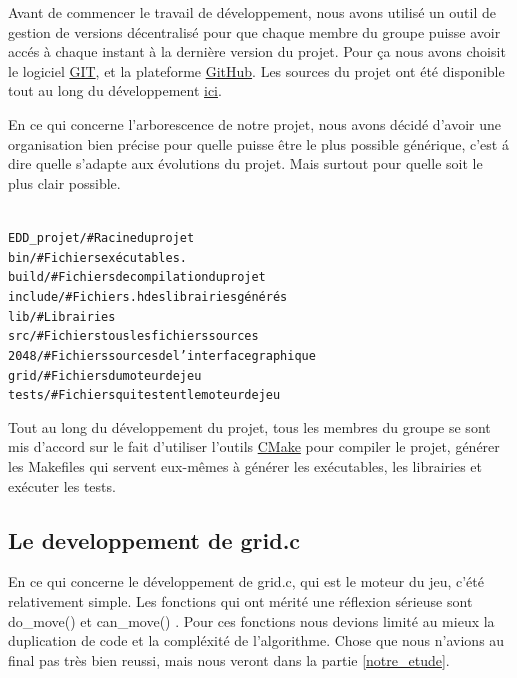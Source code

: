\documentclass[12pt]{article}
\begin{document}
Avant de commencer le travail de d\'eveloppement, nous avons utilis\'e un
outil de gestion de versions d\'ecentralis\'e pour que chaque membre du groupe
puisse avoir acc\'es \`a chaque instant \`a la derni\`ere version du projet.
Pour ça nous avons choisit le logiciel \href{http://git-scm.com/}{GIT}, et la plateforme
\href{http://github.com/}{GitHub}. Les sources du projet ont \'et\'e disponible tout
au long du d\'eveloppement \href{http://github.com/kamneo/EDD_project}{ici}.\par

En ce qui concerne l'arborescence de notre projet, nous avons d\'ecid\'e d'avoir
une organisation bien pr\'ecise pour quelle puisse \^etre le plus possible
g\'en\'erique, c'est \'a dire quelle s'adapte aux \'evolutions du projet.
Mais surtout pour quelle soit le plus clair possible.

\begin{alltt}
{\color{gray}
EDD_projet/        # Racine du projet
    bin/           # Fichiers ex\'ecutables.
    build/         # Fichiers de compilation du projet
    include/       # Fichiers .h des librairies g\'en\'er\'es
    lib/           # Librairies
    src/           # Fichiers tous les fichiers sources
        2048/      # Fichiers sources de l'interface graphique
        grid/      # Fichiers du moteur de jeu
            tests/ # Fichiers qui testent le moteur de jeu
}
\end{alltt}

\par

Tout au long du d\'eveloppement du projet, tous les membres du groupe se sont
mis d'accord sur le fait d'utiliser l'outils \href{http://www.cmake.org/}{CMake}
pour compiler le projet, g\'en\'erer les Makefiles qui servent eux-m\^emes \`a g\'en\'erer les
ex\'ecutables, les librairies et ex\'ecuter les tests.

\subsection{Le developpement de grid.c}
En ce qui concerne le d\'eveloppement de grid.c, qui est le moteur du jeu,
c'\'et\'e relativement simple. Les fonctions qui ont m\'erit\'e une r\'eflexion
s\'erieuse sont \og do\_move() \fg{} et \og can\_move() \fg{}. Pour ces
fonctions nous devions limit\'e au mieux la duplication de code et la compl\'exit\'e de
l'algorithme. Chose que nous n'avions au final pas tr\`es bien reussi, mais nous
veront dans la partie \ref{notre_etude}.
\end{document}
